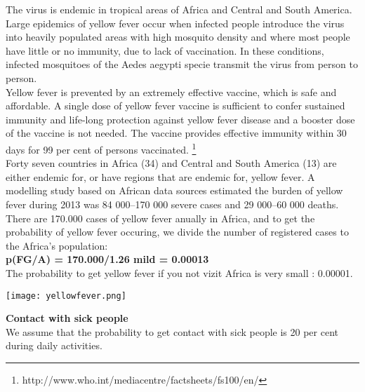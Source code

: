 \tab The virus is endemic in tropical areas of Africa and Central and South America. Large epidemics of yellow fever occur when infected people introduce the virus into heavily populated areas with high mosquito density and where most people have little or no immunity, due to lack of vaccination. In these conditions, infected mosquitoes of the Aedes aegypti specie transmit the virus from person to person. \\

\tab Yellow fever is prevented by an extremely effective vaccine, which is safe and affordable. A single dose of yellow fever vaccine is sufficient to confer sustained immunity and life-long protection against yellow fever disease and a booster dose of the vaccine is not needed. The vaccine provides effective immunity within 30 days for 99 per cent of persons vaccinated. \footnote{ http://www.who.int/mediacentre/factsheets/fs100/en/}\\

\tab Forty seven countries in Africa (34) and Central and South America (13) are either endemic for, or have regions that are endemic for, yellow fever. A modelling study based on African data sources estimated the burden of yellow fever during 2013 was 84 000–170 000 severe cases and 29 000–60 000 deaths.\\

\tab There are 170.000 cases of yellow fever anually in Africa, and to get the probability of yellow fever occuring, we divide the number of registered cases to the Africa’s population:\\

	\tab \tab \textbf{p(FG/A) = 170.000/1.26 mild = 0.00013}\\

\tab The probability to get yellow fever if you not vizit Africa is very small : 0.00001.\\

\begin{center}
  	\texttt{[image: yellowfever.png]}
\end{center}


\textbf{Contact with sick people}\\
\tab We assume that the probability to get contact with sick people is 20 per cent during daily activities.\\

